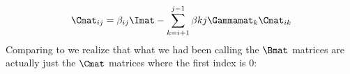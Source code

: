 \begin{equation}
  \Cmat_{i j} = \beta_{i j} \Imat - \sum \limits^{j - 1}_{k = i+1} \beta{k j} \Gammamat_k \Cmat_{i k}
\end{equation}
Comparing to  we realize that what we had been calling the $\Bmat$ matrices are actually just the $\Cmat$ matrices where the first index is 0: